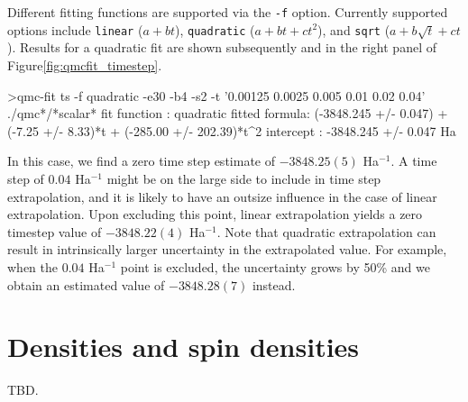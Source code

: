Different fitting functions are supported via the \texttt{-f} option.
Currently supported options include \texttt{linear} ($a+bt$),
\texttt{quadratic} ($a+bt+ct^2$), and \texttt{sqrt} ($a+b\sqrt{t}+ct$).
Results for a quadratic fit are shown subsequently and in the right
panel of Figure\ref{fig:qmcfit_timestep}.
\begin{shade}
>qmc-fit ts -f quadratic -e30 -b4 -s2 -t '0.00125 0.0025 0.005 0.01 0.02 0.04' ./qmc*/*scalar*
fit function  : quadratic
fitted formula: (-3848.245 +/- 0.047) + (-7.25 +/- 8.33)*t + (-285.00 +/- 202.39)*t^2
intercept     : -3848.245 +/- 0.047  Ha
\end{shade}
In this case, we find a zero time step estimate of $-3848.25(5)$ Ha$^{-1}$.
A time step of $0.04$ Ha$^{-1}$ might be on the large side to include in
time step extrapolation, and it is likely to have an outsize influence
in the case of linear extrapolation.  Upon excluding this point, linear
extrapolation yields a zero timestep value of $-3848.22(4)$ Ha$^{-1}$.
Note that quadratic extrapolation can result in intrinsically
larger uncertainty in the extrapolated value.  For example, when the $0.04$
Ha$^{-1}$ point is excluded, the uncertainty grows by 50\% and we obtain an
estimated value of $-3848.28(7)$ instead.



\section{Densities and spin densities}
\label{sec:densities}
TBD.





